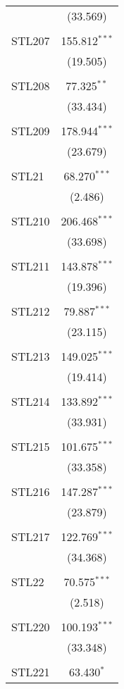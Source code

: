 \begin{table}[!htbp]
\begin{tabular}{@{\extracolsep{5pt}}lc}
  & (33.569) \\ 
  & \\ 
 STL207 & 155.812$^{***}$ \\ 
  & (19.505) \\ 
  & \\ 
 STL208 & 77.325$^{**}$ \\ 
  & (33.434) \\ 
  & \\ 
 STL209 & 178.944$^{***}$ \\ 
  & (23.679) \\ 
  & \\ 
 STL21 & 68.270$^{***}$ \\ 
  & (2.486) \\ 
  & \\ 
 STL210 & 206.468$^{***}$ \\ 
  & (33.698) \\ 
  & \\ 
 STL211 & 143.878$^{***}$ \\ 
  & (19.396) \\ 
  & \\ 
 STL212 & 79.887$^{***}$ \\ 
  & (23.115) \\ 
  & \\ 
 STL213 & 149.025$^{***}$ \\ 
  & (19.414) \\ 
  & \\ 
 STL214 & 133.892$^{***}$ \\ 
  & (33.931) \\ 
  & \\ 
 STL215 & 101.675$^{***}$ \\ 
  & (33.358) \\ 
  & \\ 
 STL216 & 147.287$^{***}$ \\ 
  & (23.879) \\ 
  & \\ 
 STL217 & 122.769$^{***}$ \\ 
  & (34.368) \\ 
  & \\ 
 STL22 & 70.575$^{***}$ \\ 
  & (2.518) \\ 
  & \\ 
 STL220 & 100.193$^{***}$ \\ 
  & (33.348) \\ 
  & \\ 
 STL221 & 63.430$^{*}$ \\ 

\end{tabular}
\end{table}
